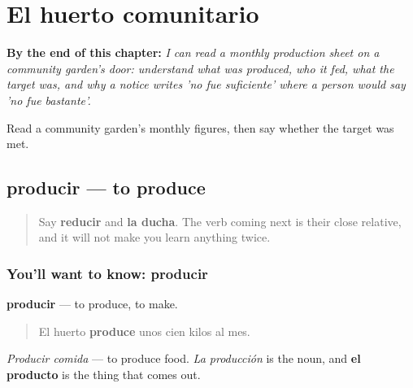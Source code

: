
\chapter{El huerto comunitario}
\label{ch:es-alimento}

\begin{chapteropening}
\textbf{By the end of this chapter:} \emph{I can read a monthly production sheet on a community garden's door: understand what was produced, who it fed, what the target was, and why a notice writes 'no fue suficiente' where a person would say 'no fue bastante'.}

Read a community garden's monthly figures, then say whether the target was met.
\end{chapteropening}

\section[producir]{producir — to produce}

\label{lesson:ES-C467-producir}



\begin{quote}
Say \textbf{reducir} and \textbf{la ducha}. The verb coming next is their close relative, and it will not make you learn anything twice.
\end{quote}

\subsection*{You'll want to know: producir}
\textbf{producir} — to produce, to make.

\begin{quote}
El huerto \textbf{produce} unos cien kilos al mes.
\end{quote}

\emph{Producir comida} — to produce food. \emph{La producción} is the noun, and \textbf{el producto} is the thing that comes out.

